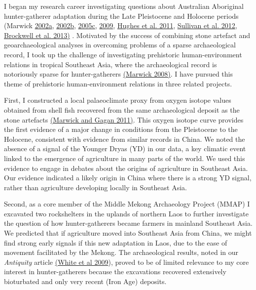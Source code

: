 \documentclass[11pt,article,oneside]{memoir}
\begin{document}
I began my research career investigating questions about Australian Aboriginal hunter-gatherer adaptation during the Late Pleistocene and Holocene periods (Marwick {\href{http://hdl.handle.net/1885/42085}{2002a}}, {\href{http://dx.doi.org/10.6084/m9.figshare.765251}{2002b}}, {\href{http://faculty.washington.edu/bmarwick/PDFs/Marwick_2005_Marillana_A.pdf}{2005c}},  \href{http://faculty.washington.edu/bmarwick/PDFs/Marwick_2009_AO_Pilbara.pdf}{2009},  \href{http://faculty.washington.edu/bmarwick/PDFs/Hughes_et_al_2011_JASSA.pdf}{Hughes et al. 2011},  \href{http://faculty.washington.edu/bmarwick/PDFs/Sullivan_et_al_2012_OSL_dates_ODX.pdf}{Sullivan et al. 2012},  \href{http://faculty.washington.edu/bmarwick/PDFs/Brockwell_et_al_2013_AA.pdf}{Brockwell et al. 2013)} . Motivated by the success of combining stone artefact and geoarchaeological analyses in overcoming problems of a sparse archaeological record, I took up the challenge of  investigating prehistoric human-environment relations in tropical Southeast Asia, where the archaeological record is notoriously sparse for hunter-gatherers {\href{http://dx.doi.org/10.6084/m9.figshare.765252}{(Marwick 2008)}}. I have pursued this theme of prehistoric human-environment relations in three related projects.

First, I constructed a local palaeoclimate proxy from oxygen isotope values obtained from shell fish recovered from the same archaeological deposit as the stone artefacts {\href{http://faculty.washington.edu/bmarwick/PDFs/Marwick_and_Gagan_2011_QSR.pdf}{(Marwick and Gagan 2011)}}. This oxygen isotope curve provides the first evidence of a major change in conditions from the Pleistocene to the Holocene, consistent with evidence from similar records in China. We noted the absence of a signal of the Younger Dryas (YD) in our data, a key climatic event linked to the emergence of agriculture in many parts of the world. We used this evidence to engage in debates about the origins of agriculture in Southeast Asia. Our evidence indicated a likely origin in China where there is a strong YD signal, rather than agriculture developing locally in Southeast Asia.

Second, as a core member of the Middle Mekong Archaeology Project (MMAP) I excavated two rockshelters in the uplands of northern Laos to further investigate the question of how hunter-gatherers became farmers in mainland Southeast Asia. We predicted that if agriculture moved into Southeast Asia from China, we might find strong early signals if this new adaptation in Laos, due to the ease of movement facilitated by the Mekong.  The archaeological results, noted in our \textit{Antiquity} article {\href{http://antiquity.ac.uk/projgall/white/}{(White et al 2009})}, proved to be of limited relevance to my core interest in hunter-gatherers because the excavations recovered extensively bioturbated and only very recent (Iron Age) deposits. 
\end{document}
